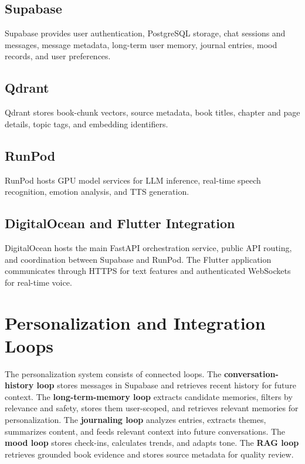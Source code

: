 \documentclass[12pt,a4paper,oneside,openany]{report}
\begin{document}
\subsection{Supabase}

Supabase provides user authentication, PostgreSQL storage, chat sessions and messages, message metadata, long-term user memory, journal entries, mood records, and user preferences.

\subsection{Qdrant}

Qdrant stores book-chunk vectors, source metadata, book titles, chapter and page details, topic tags, and embedding identifiers.

\subsection{RunPod}

RunPod hosts GPU model services for LLM inference, real-time speech recognition, emotion analysis, and TTS generation.

\subsection{DigitalOcean and Flutter Integration}

DigitalOcean hosts the main FastAPI orchestration service, public API routing, and coordination between Supabase and RunPod. The Flutter application communicates through HTTPS for text features and authenticated WebSockets for real-time voice.

\section{Personalization and Integration Loops}

The personalization system consists of connected loops. The \textbf{conversation-history loop} stores messages in Supabase and retrieves recent history for future context. The \textbf{long-term-memory loop} extracts candidate memories, filters by relevance and safety, stores them user-scoped, and retrieves relevant memories for personalization. The \textbf{journaling loop} analyzes entries, extracts themes, summarizes content, and feeds relevant context into future conversations. The \textbf{mood loop} stores check-ins, calculates trends, and adapts tone. The \textbf{RAG loop} retrieves grounded book evidence and stores source metadata for quality review.
\end{document}
